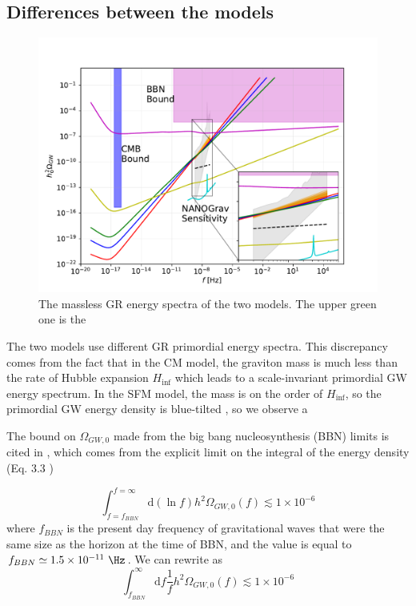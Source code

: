 \subsection{Differences between the models}

\begin{figure}[h]
    \centering
    \includegraphics[width=\linewidth]{fig/fig5.pdf} 
    \caption{The massless GR energy spectra of the two models. The upper green one is the  }
\end{figure}
The two models use different GR primordial energy spectra. This discrepancy comes from the fact that in the CM model, the graviton mass is much less than the rate of Hubble expansion $H_{\inf}$ which leads to a scale-invariant primordial GW energy spectrum. In the SFM model, the mass is on the order of $H_{\inf}$, so the primordial GW energy density is blue-tilted \cite{Fujita:2018}, so we observe a  

The bound on $\Omega_{GW,0}$ made from the big bang nucleosynthesis (BBN) limits is cited in \cite{Fujita:2018}, which comes from the explicit limit on the integral of the energy density (Eq. 3.3 \cite{Tanin:2021}) 

\begin{equation} \label{eq:1}
    \int_{f = f_{BBN}}^{f = \infty}\mbox{d}(\ln{f}) h^2\Omega_{GW,0}(f) \lesssim 1\times 10^{-6}
\end{equation} 
where $f_{BBN}$ is the present day frequency of gravitational waves that were the same size as the horizon at the time of BBN, and the value is equal to $f_{BBN} \simeq 1.5\times 10^{-11} \ \Hz$. We can rewrite  as 
\begin{equation} \label{eq:11}
    \int_{f_{BBN}}^{\infty}\mbox{d}f \frac{1}{f} h^2\Omega_{GW,0}(f) \lesssim 1\times 10^{-6}
\end{equation} 


